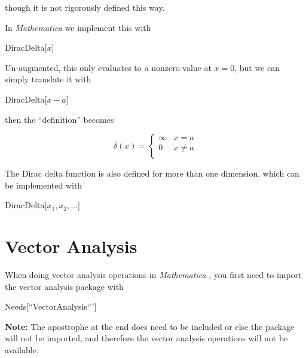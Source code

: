 \documentclass[11pt,letterpaper,twoside,titlepage]{book}
\newcommand{\Mathematica}{\textit{Mathematica} }
\begin{document}
				though it is not rigorously defined this way.  
				
				In \Mathematica we implement this with
				
				\begin{center}
				
					DiracDelta[$x$]
				
				\end{center}
				
				Un-augmented, this only evaluates to a nonzero value at $x=0$, but we can simply translate it with 
				
				\begin{center}
				
					DiracDelta[$x-a$]
				
				\end{center}
				
				then the ``definition'' becomes
				
				\[ \delta(x) =  \begin{cases}
									\infty & x = a  \\
									0 & x \neq a \\
				 				\end{cases}
				\]
				
				The Dirac delta function is also defined for more than one dimension, which can be implemented with
				
				\begin{center}
				
					DiracDelta[$x_1, x_2, \ldots$]
				
				\end{center}
				
			\section{Vector Analysis}
			
				When doing vector analysis operations in \Mathematica, you first need to import the vector analysis package with
				
				\begin{center}
				
					Needs[``VectorAnalysis`'']
				
				\end{center}
				
				\textbf{Note:} The apostrophe at the end does need to be included or else the package will not be imported, and therefore the vector analysis operations will not be available.  
				
\end{document}
